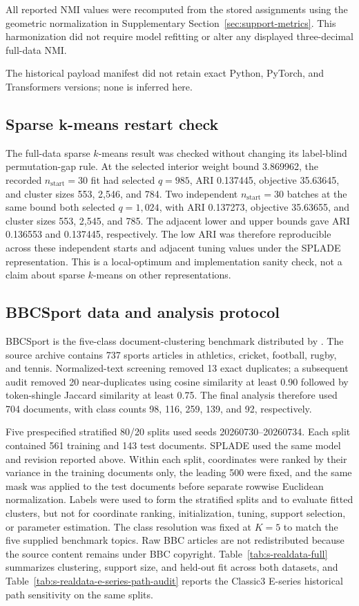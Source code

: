 \documentclass[preprint,12pt,authoryear]{elsarticle}
\begin{document}
All reported NMI values were recomputed from the stored assignments using the
geometric normalization in Supplementary Section~\ref{sec:support-metrics}.
This harmonization did
not require model refitting or alter any displayed three-decimal full-data NMI.

The historical payload manifest did not retain exact Python, PyTorch, and
Transformers versions; none is inferred here.

\subsection{Sparse k-means restart check}

The full-data sparse $k$-means result was checked without changing its
label-blind permutation-gap rule. At the selected interior weight bound
3.869962, the recorded $n_{\mathrm{start}}=30$ fit had selected $q=985$,
ARI 0.137445, objective 35.63645, and cluster sizes 553, 2{,}546, and 784. Two
independent $n_{\mathrm{start}}=30$ batches at the same bound both selected
$q=1{,}024$, with ARI 0.137273, objective 35.63655, and cluster sizes 553, 2{,}545,
and 785. The adjacent lower and upper bounds gave ARI 0.136553 and 0.137445,
respectively. The low ARI was therefore reproducible across these independent
starts and adjacent tuning values under the SPLADE representation. This is a
local-optimum and implementation sanity check, not a claim about sparse
$k$-means on other representations.

\subsection{BBCSport data and analysis protocol}

BBCSport is the five-class document-clustering benchmark distributed by
\citet{greene2006diagonal}. The source archive contains 737 sports articles in
athletics, cricket, football, rugby, and tennis. Normalized-text screening
removed 13 exact duplicates; a subsequent audit removed 20 near-duplicates
using cosine similarity at least 0.90 followed by token-shingle Jaccard
similarity at least 0.75. The final analysis therefore used 704 documents,
with class counts 98, 116, 259, 139, and 92, respectively.

Five prespecified stratified 80/20 splits used seeds 20260730--20260734. Each
split contained 561 training and 143 test documents. SPLADE used the same
model and revision reported above. Within each split, coordinates were ranked
by their variance in the training documents only, the leading 500 were fixed,
and the same mask was applied to the test documents before separate rowwise
Euclidean normalization. Labels were used to form the stratified splits and
to evaluate fitted clusters, but not for coordinate ranking, initialization,
tuning, support selection, or parameter estimation. The class resolution was
fixed at $K=5$ to match the five supplied benchmark topics. Raw BBC articles
are not redistributed because the source content remains under BBC copyright.
Table~\ref{tab:s-realdata-full} summarizes clustering, support size, and
held-out fit across both datasets, and
Table~\ref{tab:s-realdata-e-series-path-audit} reports the Classic3 E-series
historical path sensitivity on the same splits.
\end{document}
